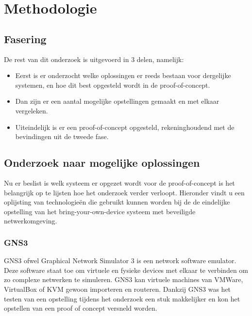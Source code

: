 
\chapter{Methodologie}
\label{ch:methodologie}


\section{Fasering}

De rest van dit onderzoek is uitgevoerd in 3 delen, namelijk: 
\begin{itemize}
	\item Eerst is er onderzocht welke oplossingen er reeds bestaan voor dergelijke systemen, en hoe dit best opgesteld wordt in de proof-of-concept.
	\item Dan zijn er een aantal mogelijke opstellingen gemaakt en met elkaar vergeleken.
	\item Uiteindelijk is er een proof-of-concept opgesteld, rekeninghoudend met de bevindingen uit de tweede fase.
\end{itemize}

\section{Onderzoek naar mogelijke oplossingen}
Nu er beslist is welk systeem er opgezet wordt voor de proof-of-concept is het belangrijk op te lijsten hoe het onderzoek verder verloopt. Hieronder vindt u een oplijsting van technologie\"{e}n die gebruikt kunnen worden bij de de eindelijke opstelling van het bring-your-own-device systeem met beveiligde netwerkomgeving.

\subsection{GNS3}
GNS3 ofwel Graphical Network Simulator 3 is een network software emulator. Deze software staat toe om virtuele en fysieke devices met elkaar te verbinden om zo complexe netwerken te simuleren. GNS3 kan virtuele machines van VMWare, VirtualBox of KVM gewoon importeren en routeren. Dankzij GNS3 was het testen van een opstelling tijdens het onderzoek een stuk makkelijker en kon het opstellen van een proof of concept versneld worden.

